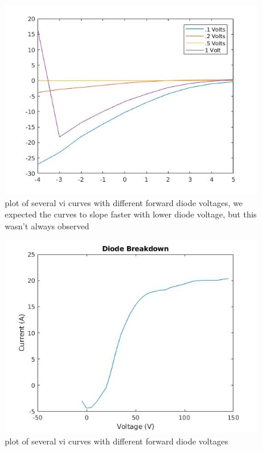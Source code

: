\documentclass[a4paper]{article}
\begin{document}
\begin{figure}[H]
\centering
\includegraphics[scale=0.5]{vi_curves.jpg}
\caption{\label{fig} plot of several vi curves with different forward diode voltages, we expected the curves to slope faster with lower diode voltage, but this wasn't always observed}
\end{figure}

\begin{figure}[H]
\centering
\includegraphics[scale=0.5]{diode_break.jpg}
\caption{\label{fig} plot of several vi curves with different forward diode voltages}
\end{figure}
\end{document}
